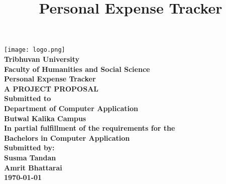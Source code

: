 \documentclass[12pt]{report} %
\title{Personal Expense Tracker}
\author{} %
\date{}   %
\begin{document}
\thispagestyle{empty} %
\begin{center}
    \texttt{[image: logo.png]} \\[1cm] %
    

    \Large \textbf{Tribhuvan University} \\[-0.1cm]
    \Large \textbf {Faculty of Humanities and Social Science} \\[1cm]

    

    \large \textbf{Personal Expense Tracker} \\[1cm]
     \textbf{A PROJECT PROPOSAL} \\[1cm]

    

    \large \textbf{Submitted to}  \\[-0.1cm]
    \large \textbf {Department of Computer Application} \\[-0.1cm]
    \large \textbf {Butwal Kalika Campus} \\[1cm]


    

    \textbf{In partial fulfillment of the requirements for the} \\[-0.1cm]
    \textbf{Bachelors in Computer Application} \\[1.2cm]



    \large \textbf{Submitted by:}  \\[0cm]
    \textbf{Susma Tandan} \\[-0.2cm]
    \textbf{Amrit Bhattarai} \\[1cm]
    

    \Large \textbf {\today}
\end{center}
\newpage

\pagestyle{plain} %

\centering\renewcommand{\contentsname}{\Huge \bfseries Table of Contents}
\tableofcontents
\newpage
{}
\end{document}

